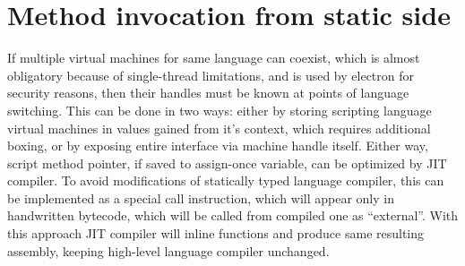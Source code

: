 \documentclass[times, %
			   specification,annotation, %
			   titlepage-extra-ru,specification-extra-ru,annotation-extra-ru, %
			   languages={russian,english} %
			  ]{itmo-student-thesis}
\begin{document}
\section{Method invocation from static side}
If multiple virtual machines for same language can coexist, which is almost obligatory because of single-thread limitations, and is used by electron for security reasons, then their handles must be known at points of language switching. This can be done in two ways: either by storing scripting language virtual machines in values gained from it's context, which requires additional boxing, or by exposing entire interface via machine handle itself. Either way, script method pointer, if saved to assign-once variable, can be optimized by JIT compiler. To avoid modifications of statically typed language compiler, this can be implemented as a special call instruction, which will appear only in handwritten bytecode, which will be called from compiled one as ``external''. With this approach JIT compiler will inline functions and produce same resulting assembly, keeping high-level language compiler unchanged.
\end{document}
